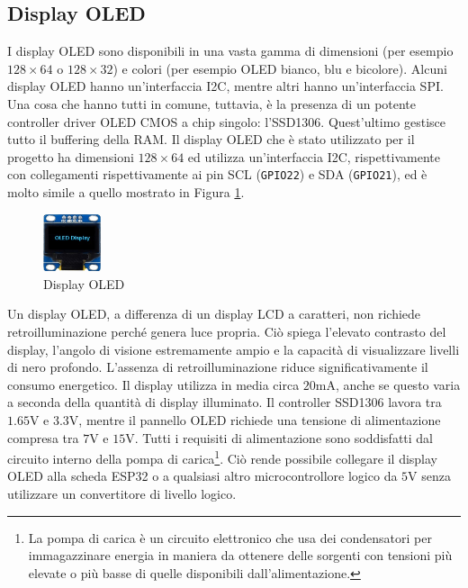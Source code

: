\documentclass[a4paper,12pt]{report}  %
\newcommand{\lstinlinebg}[1]{\colorbox{backcolour}{\lstinline|#1|}}
\begin{document}
\subsection{Display OLED}
I display OLED sono disponibili in una vasta gamma di dimensioni (per esempio $128 \times 64$ o $128 \times 32$) e colori (per esempio OLED bianco, blu e bicolore).
Alcuni display OLED hanno un'interfaccia I2C, mentre altri hanno un'interfaccia SPI.
Una cosa che hanno tutti in comune, tuttavia, è la presenza di un potente controller driver OLED CMOS a chip singolo: l'SSD1306.
Quest'ultimo gestisce tutto il buffering della RAM.
Il display OLED che è stato utilizzato per il progetto ha dimensioni $128 \times 64$ ed utilizza un'interfaccia I2C, rispettivamente con collegamenti rispettivamente ai pin SCL (\lstinlinebg{GPIO22}) e SDA (\lstinlinebg{GPIO21}), ed è molto simile a quello mostrato in Figura \ref{fig:OLED}.

\begin{figure}[h]
    \centering
    \includegraphics[width=0.15\textwidth]{imgs/128x64-Blue-I2C-OLED-Display.jpg}
    \caption{Display OLED}
    \label{fig:OLED}
\end{figure}

Un display OLED, a differenza di un display LCD a caratteri, non richiede retroilluminazione perché genera luce propria.
Ciò spiega l'elevato contrasto del display, l'angolo di visione estremamente ampio e la capacità di visualizzare livelli di nero profondo.
L'assenza di retroilluminazione riduce signiﬁcativamente il consumo energetico.
Il display utilizza in media circa $20 \text{mA}$, anche se questo varia a seconda della quantità di display illuminato.
Il controller SSD1306 lavora tra $1.65 \text{V}$ e $3.3 \text{V}$, mentre il pannello OLED richiede una tensione di alimentazione compresa tra $7 \text{V}$ e $15 \text{V}$.
Tutti i requisiti di alimentazione sono soddisfatti dal circuito interno della pompa di carica\footnote{La pompa di carica è un circuito elettronico che usa dei condensatori per immagazzinare energia in maniera da ottenere delle sorgenti con tensioni più elevate o più basse di quelle disponibili dall'alimentazione.}.
Ciò rende possibile collegare il display OLED alla scheda ESP32 o a qualsiasi altro microcontrollore logico da $5 \text{V}$ senza utilizzare un convertitore di livello logico.
\end{document}
